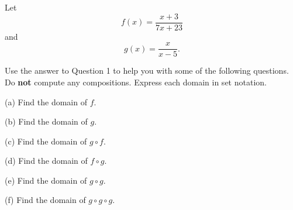 \documentclass{ximera}
\begin{document}
\begin{example} \label{Ex1:Comp}
Let 
\[
     f(x) = \frac{x+3}{7x+23}
\]
and
\[
    g(x) = \frac{x}{x-5} .
\]

Use the answer to Question 1 to help you with some of the following questions. Do {\bf not} compute any compositions. Express each domain in set notation.
 
(a) Find the domain of $f$.

(b) Find the domain of $g$.

(c) Find the domain of $g\circ f$.

(d) Find the domain of $f\circ g$.

(e) Find the domain of $g\circ g$.

(f) Find the domain of $g\circ g\circ g$.

\end{example}
\end{document}
